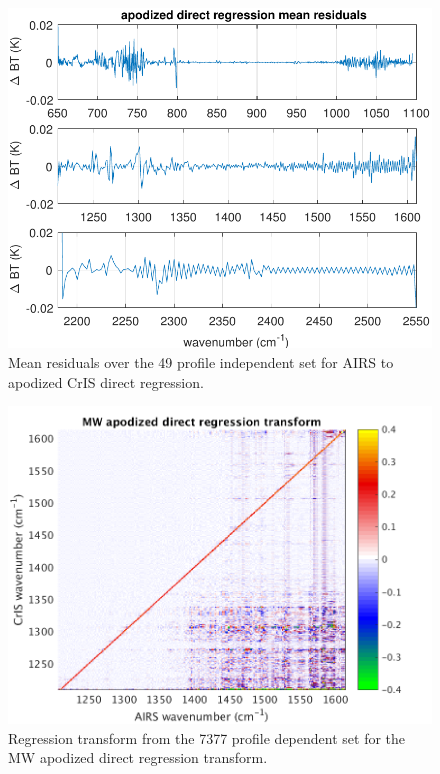 \documentclass[journal]{IEEEtran}
\begin{document}

\begin{figure} %
  \centering
  \includegraphics[width=\linewidth]{figures/ap_dir_regr.pdf}
  \caption{Mean residuals over the 49 profile independent set for
    AIRS to apodized CrIS direct regression.}
  \label{dreg1}
\end{figure}

\begin{figure} %
  \centering
  \includegraphics[width=\linewidth]{figures/MW_dir_regr_mat.png}
  \caption{Regression transform from the 7377 profile dependent set
    for the MW apodized direct regression transform.}
  \label{dreg3}
\end{figure}
\end{document}
